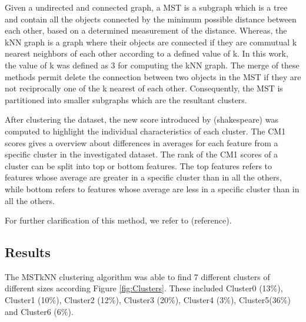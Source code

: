 \documentclass{article}
\begin{document}
Given a undirected and connected graph, a MST is a subgraph which is a tree and
contain all the objects connected by the minimum possible distance between each
other, based on a determined measurement of the distance. Whereas, the kNN graph
is a graph where their objects are connected if they are commutual k nearest
neighbors of each other according to a defined value of k. In this work, the
value of k was defined as 3 for computing the kNN graph. The merge of these
methods permit delete the connection between two objects in the MST if they are
not reciprocally one of the k nearest of each other. Consequently, the MST is
partitioned into smaller subgraphs which are the resultant clusters.



After clustering the dataset, the new score introduced by (shakespeare) was
computed to highlight the individual characteristics of each cluster. The CM1
scores gives a overview about differences in averages for each feature from a
specific cluster in the investigated dataset. The rank of the CM1 scores of a
cluster can be split into top or bottom features. The top features refers to
features whose average are greater in a specific cluster than in all the others,
while bottom refers to features whose average are less in a specific cluster
than in all the others.






For further clarification of this method, we refer to (reference). 


\subsection{Results}

The MSTkNN clustering algorithm was able to find 7 different clusters of
different sizes according Figure \ref{fig:Clusters}. These included Cluster0
(13\%), Cluster1 (10\%), Cluster2 (12\%), Cluster3 (20\%), Cluster4 (3\%),
Cluster5(36\%) and Cluster6 (6\%).
\end{document}
